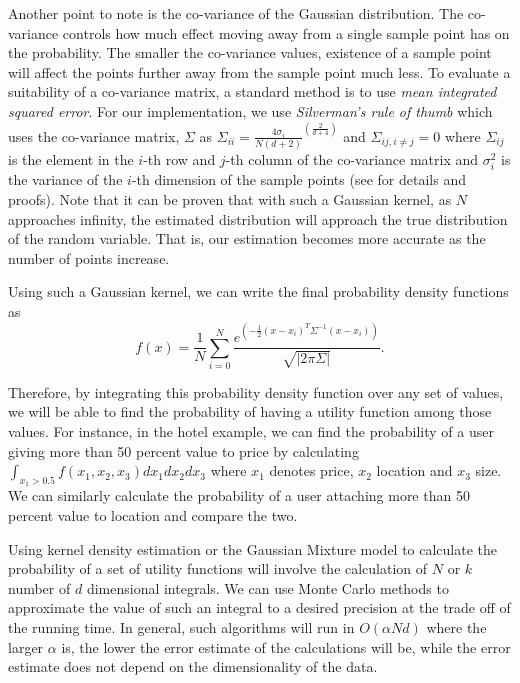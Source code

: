 Another point to note is the co-variance of the Gaussian distribution. The co-variance  controls how much effect moving away from a single sample point has on the probability. The smaller the co-variance values, existence of a sample point will affect the points further away from the sample point much less. To evaluate a suitability of a co-variance matrix, a standard method is to use \textit{mean integrated squared error}. For our implementation, we use \textit{Silverman's rule of thumb} which uses the co-variance matrix, $\Sigma$ as $\Sigma_{ii} = \frac{4\sigma_i}{N(d+2)}^{(\frac{2}{d+4})}$ and $\Sigma_{ij, i \neq j} = 0$ where $\Sigma_{ij}$ is the element in the $i$-th row and $j$-th column of the co-variance matrix and $\sigma_i^2$ is the variance of the $i$-th dimension of the sample points (see \cite{silverman} for details and proofs). Note that it can be proven that with such a Gaussian kernel, as $N$ approaches infinity, the estimated distribution will approach the true distribution of the random variable. That is, our estimation becomes more accurate as the number of points increase.

Using such a Gaussian kernel, we can write the final probability density functions as 
\begin{equation*}
f(x) = \frac{1}{N}\sum_{i = 0}^{N}\frac{e^{(-\frac{1}{2}(x - x_i)^T\Sigma^{-1}(x - x_i))}}{\sqrt{\left\vert2\pi\Sigma\right\vert}}.
\end{equation*}

Therefore, by integrating this probability density function over any set of values, we will be able to find the probability of having a utility function among those values. For instance, in the hotel example, we can find the probability of a user giving more than 50 percent value to price by calculating $\int_{x_1>0.5}f(x_1, x_2, x_3)dx_1dx_2dx_3$ where $x_1$ denotes price, $x_2$ location and $x_3$ size. We can similarly calculate the probability of a user attaching more than 50 percent value to location and compare the two.

Using kernel density estimation or the Gaussian Mixture model to calculate the probability of a set of utility functions will involve the calculation of $N$ or $k$ number of $d$ dimensional integrals. We can use Monte Carlo methods to approximate the value of such an integral to a desired precision at the trade off of the running time. In general, such algorithms will run in $O(\alpha Nd)$ where the larger $\alpha$ is, the lower the error estimate of the calculations will be, while the error estimate does not depend on the dimensionality of the data. 

